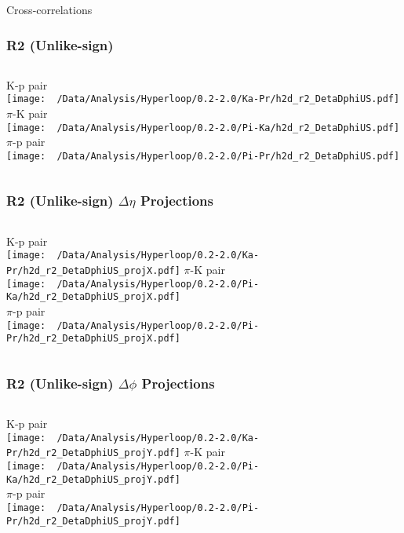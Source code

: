 \documentclass{beamer}
\begin{document}
\begin{frame}
	\Large Cross-correlations
\end{frame}
\begin{frame}
	\frametitle{R2 (Unlike-sign)}
	\begin{columns}
		\centering
		K-p pair\\
		\texttt{[image: ~/Data/Analysis/Hyperloop/0.2-2.0/Ka-Pr/h2d\_r2\_DetaDphiUS.pdf]}
		\centering
		$\pi$-K pair\\
		\texttt{[image: ~/Data/Analysis/Hyperloop/0.2-2.0/Pi-Ka/h2d\_r2\_DetaDphiUS.pdf]}\\$\pi$-p pair\\
		\texttt{[image: ~/Data/Analysis/Hyperloop/0.2-2.0/Pi-Pr/h2d\_r2\_DetaDphiUS.pdf]}
	\end{columns}
\end{frame}
\begin{frame}
	\frametitle{R2 (Unlike-sign) $\Delta\eta$ Projections}
	\begin{columns}
		\column{0.5\textwidth}
		\centering
		K-p pair\\
		\texttt{[image: ~/Data/Analysis/Hyperloop/0.2-2.0/Ka-Pr/h2d\_r2\_DetaDphiUS\_projX.pdf]}
		\column{0.5\textwidth}
		\centering
		$\pi$-K pair\\
		\texttt{[image: ~/Data/Analysis/Hyperloop/0.2-2.0/Pi-Ka/h2d\_r2\_DetaDphiUS\_projX.pdf]}\\$\pi$-p pair\\
		\texttt{[image: ~/Data/Analysis/Hyperloop/0.2-2.0/Pi-Pr/h2d\_r2\_DetaDphiUS\_projX.pdf]}
	\end{columns}
\end{frame}
\begin{frame}
	\frametitle{R2 (Unlike-sign) $\Delta\phi$ Projections}
	\begin{columns}
		\centering
		K-p pair\\
		\texttt{[image: ~/Data/Analysis/Hyperloop/0.2-2.0/Ka-Pr/h2d\_r2\_DetaDphiUS\_projY.pdf]}
		\centering
		$\pi$-K pair\\
		\texttt{[image: ~/Data/Analysis/Hyperloop/0.2-2.0/Pi-Ka/h2d\_r2\_DetaDphiUS\_projY.pdf]}\\$\pi$-p pair\\
		\texttt{[image: ~/Data/Analysis/Hyperloop/0.2-2.0/Pi-Pr/h2d\_r2\_DetaDphiUS\_projY.pdf]}
	\end{columns}
\end{frame}
\end{document}
